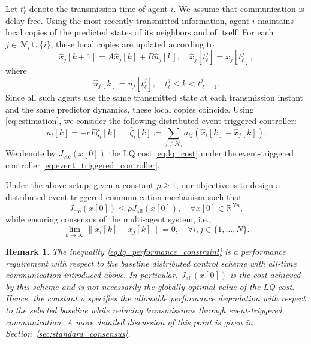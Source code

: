 \documentclass[letterpaper,10pt,conference]{ieeeconf}
\newtheorem{remark}{Remark}
\newcommand{\R}{\mathbb{R}}
\begin{document}
Let $t^i_\ell$ denote the transmission time of agent $i$.
We assume that communication is delay-free.
Using the most recently transmitted information, agent $i$ maintains local copies of the predicted states of its neighbors and of itself.
For each $j \in \mathcal{N}_i \cup \{i\}$, these local copies are updated according to
\begin{equation} \label{eq:estimation}
  \hat{x}_j[k+1] = A\hat{x}_j[k] + B\hat{u}_j[k],\quad
  \hat{x}_j[t^j_\ell] = x_j[t^j_\ell],
\end{equation}
where
\begin{equation} \label{eq:control_input_for_estimation}
  \hat{u}_j[k] = u_j[t^j_\ell],\quad t^j_\ell \leq k < t^j_{\ell+1}.
\end{equation}
Since all such agents use the same transmitted state at each transmission instant and the same predictor dynamics, these local copies coincide.
Using \eqref{eq:estimation}, we consider the following distributed event-triggered controller:
\begin{equation} \label{eq:event_triggered_controller}
  u_i[k] = -cF \hat{\zeta}_i[k],\quad
  \hat{\zeta}_i[k] \coloneqq \sum_{j \in \mathcal{N}_i} a_{ij} \left(\hat{x}_i[k] - \hat{x}_j[k]\right).
\end{equation}
We denote by $J_{\mathrm{etc}}(x[0])$ the LQ cost \eqref{eq:lq_cost} under the event-triggered controller \eqref{eq:event_triggered_controller}.

Under the above setup, given a constant $\rho \geq 1$, our objective is to design a distributed event-triggered communication mechanism such that
\begin{equation} \label{eq:lq_performance_constraint}
  J_{\mathrm{etc}}(x[0]) \leq \rho J_{\mathrm{all}}(x[0]),\quad \forall x[0] \in \R^{Nn},
\end{equation}
while ensuring consensus of the multi-agent system, i.e.,
\begin{equation} \label{eq:def_consensus}
  \lim_{k\to\infty} \|x_i[k]-x_j[k]\| = 0,\quad \forall i,j \in \{1,\dots,N\}.
\end{equation}

\begin{remark} \label{rem:baseline_performance}
  The inequality \eqref{eq:lq_performance_constraint} is a performance requirement with respect to the baseline distributed control scheme with all-time communication introduced above.
  In particular, $J_{\mathrm{all}}(x[0])$ is the cost achieved by this scheme and is not necessarily the globally optimal value of the LQ cost.
  Hence, the constant $\rho$ specifies the allowable performance degradation with respect to the selected baseline while reducing transmissions through event-triggered communication.
  A more detailed discussion of this point is given in Section~\ref{sec:standard_consensus}.
\end{remark}
\end{document}
